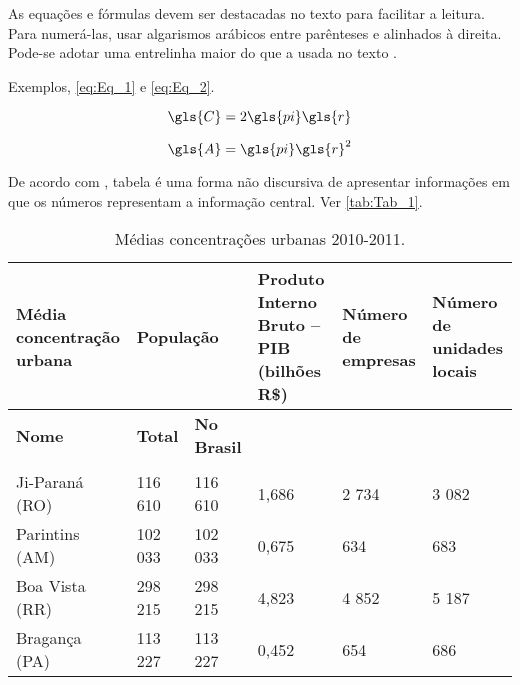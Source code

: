 As equações e fórmulas devem ser destacadas no texto para facilitar a leitura.  Para numerá-las, usar algarismos arábicos entre parênteses e alinhados à direita. Pode-se adotar uma entrelinha maior do que a usada no texto \cite{NBR14724:2011}.

Exemplos, \autoref{eq:Eq_1} e \autoref{eq:Eq_2}.

\begin{equation}\label{eq:Eq_1}
\gls{C} = 2 \gls{pi} \gls{r}
\end{equation}

\begin{equation}\label{eq:Eq_2}
\gls{A} = \gls{pi} \gls{r}^2
\end{equation}


De acordo com \textcite{ibge1993}, tabela é uma forma não discursiva de apresentar informações em que os números representam a informação central. Ver \autoref{tab:Tab_1}.

\begin{table}[htb]
	\ABNTEXfontereduzida
	\caption{\label{tab:Tab_1}Médias concentrações urbanas 2010-2011.}
	\begin{tabular}{@{}p{3.0cm}p{1.5cm}p{2cm}p{2.5cm}p{2.5cm}p{2.5cm}@{}}
		\toprule
		\textbf{Média concentração urbana} & \multicolumn{2}{l}{\textbf{População}} & \textbf{Produto Interno Bruto – PIB (bilhões R\$)} & \textbf{Número de empresas} & \textbf{Número de unidades locais} \\ \midrule
		\textbf{Nome}                      & \textbf{Total}   & \textbf{No Brasil}  &                                                   &                             & \\
		                      &    &    &                                                   &                             & \\
		Ji-Paraná (RO)                     & 116 610          & 116 610             & 1,686                                             & 2 734                       & 3 082 \\
		Parintins (AM)                     & 102 033          & 102 033             & 0,675                                             & 634                         & 683 \\
		Boa Vista (RR)                     & 298 215          & 298 215             & 4,823                                             & 4 852                       & 5 187 \\
		Bragança (PA)                      & 113 227          & 113 227             & 0,452                                             & 654                         & 686 \\ \bottomrule
	\end{tabular}
\end{table}